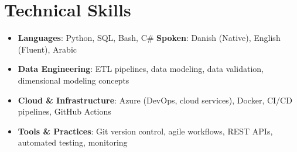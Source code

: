 \documentclass[letterpaper,11pt]{article}
\newcommand{\resumeSubHeadingListStart}{\begin{itemize}[leftmargin=*]}
\newcommand{\resumeSubHeadingListEnd}{\end{itemize}}
\begin{document}
\section{Technical Skills}
 \resumeSubHeadingListStart
   \item{
     \textbf{Languages}{: Python, SQL, Bash, C\# \hfill \textbf{Spoken}: Danish (Native), English (Fluent), Arabic}
   }
   \item{
     \textbf{Data Engineering}{: ETL pipelines, data modeling, data validation, dimensional modeling concepts}
   }
   \item{
     \textbf{Cloud \& Infrastructure}{: Azure (DevOps, cloud services), Docker, CI/CD pipelines, GitHub Actions}
   }
   \item{
     \textbf{Tools \& Practices}{: Git version control, agile workflows, REST APIs, automated testing, monitoring}
   }
 \resumeSubHeadingListEnd


\end{document}
